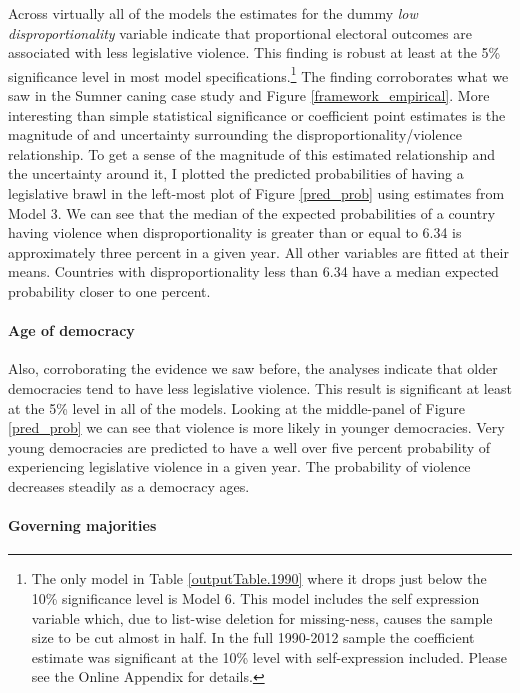 \documentclass[a4paper]{article}\usepackage[]{graphicx}\usepackage[]{color}
\begin{document}
Across virtually all of the models the estimates for the dummy {\emph{low disproportionality}} variable indicate that proportional electoral outcomes are associated with less legislative violence. This finding is robust at least at the 5\% significance level in most model specifications.\footnote{The only model in Table \ref{outputTable.1990} where it drops just below the 10\% significance level is Model 6. This model includes the self expression variable which, due to list-wise deletion for missing-ness, causes the sample size to be cut almost in half. In the full 1990-2012 sample the coefficient estimate was significant at the 10\% level with self-expression included. Please see the Online Appendix for details.} The finding corroborates what we saw in the Sumner caning case study and Figure \ref{framework_empirical}. More interesting than simple statistical significance or coefficient point estimates is the magnitude of and uncertainty surrounding the disproportionality/violence relationship. To get a sense of the magnitude of this estimated relationship and the uncertainty around it, I plotted the predicted probabilities of having a legislative brawl in the left-most plot of Figure \ref{pred_prob} using estimates from Model 3. We can see that the median of the expected probabilities of a country having violence when disproportionality is greater than or equal to 6.34 is approximately three percent in a given year. All other variables are fitted at their means. Countries with disproportionality less than 6.34 have a median expected probability closer to one percent.

\paragraph{Age of democracy}

Also, corroborating the evidence we saw before, the analyses indicate that older democracies tend to have less legislative violence. This result is significant at least at the 5\% level in all of the models. Looking at the middle-panel of Figure \ref{pred_prob} we can see that violence is more likely in younger democracies. Very young democracies are predicted to have a well over five percent probability of experiencing legislative violence in a given year. The probability of violence decreases steadily as a democracy ages.

\paragraph{Governing majorities}
\end{document}
